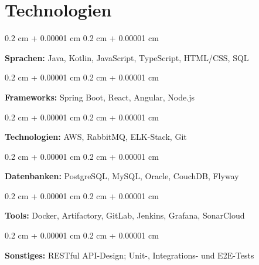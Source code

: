 \documentclass[11pt, letterpaper]{article}
\newenvironment{onecolentry}{
    \begin{adjustwidth}{
        0.2 cm + 0.00001 cm
    }{
        0.2 cm + 0.00001 cm
    }
}{
    \end{adjustwidth}
} %
\begin{document}
    \section{Technologien}
    \begin{onecolentry}
        \textbf{Sprachen:} Java, Kotlin, JavaScript, TypeScript, HTML/CSS, SQL
    \end{onecolentry}
    
    \vspace{0.2cm}
    
    \begin{onecolentry}
        \textbf{Frameworks:} Spring Boot, React, Angular, Node.js
    \end{onecolentry}
    
    \vspace{0.2cm}
    
    \begin{onecolentry}
        \textbf{Technologien:} AWS, RabbitMQ, ELK-Stack, Git
    \end{onecolentry}
    
    \vspace{0.2cm}
    
    \begin{onecolentry}
        \textbf{Datenbanken:} PostgreSQL, MySQL, Oracle, CouchDB, Flyway
    \end{onecolentry}
    
    \vspace{0.2cm}
    
    \begin{onecolentry}
        \textbf{Tools:} Docker, Artifactory, GitLab, Jenkins, Grafana, SonarCloud
    \end{onecolentry}
    
    \vspace{0.2cm}
    
    \begin{onecolentry}
        \textbf{Sonstiges:} RESTful API-Design; Unit-, Integrations- und E2E-Tests
    \end{onecolentry}
    
\end{document}
